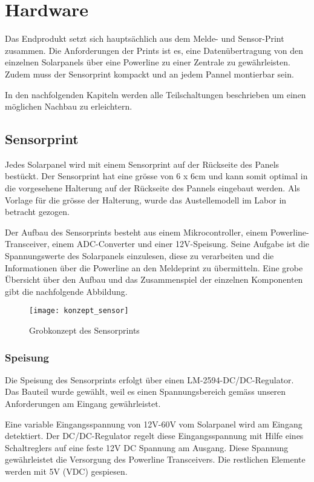 \section{Hardware}
Das Endprodukt setzt sich hauptsächlich aus dem Melde- und Sensor-Print zusammen. Die Anforderungen der Prints ist es, eine Datenübertragung von den einzelnen Solarpanels über eine Powerline zu einer Zentrale zu gewährleisten. Zudem muss der Sensorprint kompackt und an jedem Pannel montierbar sein.

In den nachfolgenden Kapiteln werden alle Teilschaltungen beschrieben um einen möglichen Nachbau zu erleichtern.

\subsection{Sensorprint}


Jedes Solarpanel wird mit einem Sensorprint auf der Rückseite des Panels bestückt. Der Sensorprint hat eine grösse von 6 x 6cm und kann somit optimal in die vorgesehene Halterung auf der Rückseite des Pannels eingebaut werden. Als Vorlage für die grösse der Halterung, wurde das Austellemodell im Labor in betracht gezogen.

Der Aufbau des Sensorprints besteht aus einem Mikrocontroller, einem Powerline-Transceiver, einem ADC-Converter und einer 12V-Speisung. Seine Aufgabe ist die Spannungswerte des Solarpanels einzulesen, diese zu verarbeiten und die Informationen über die Powerline an den Meldeprint zu übermitteln. Eine grobe Übersicht über den Aufbau und das Zusammenspiel der einzelnen Komponenten gibt die nachfolgende Abbildung.

\begin{figure}[h]
\centering
\texttt{[image: konzept\_sensor]}
\caption{Grobkonzept des Sensorprints}
\end{figure}

\subsubsection{Speisung}
Die Speisung des Sensorprints erfolgt über einen LM-2594-DC/DC-Regulator. Das Bauteil wurde gewählt, weil es einen Spannungsbereich gemäss unseren Anforderungen am Eingang gewährleistet.

Eine variable Eingangsspannung von 12V-60V vom Solarpanel wird am Eingang detektiert. Der DC/DC-Regulator regelt diese Eingangsspannung mit Hilfe eines Schaltreglers auf eine feste 12V DC Spannung am Ausgang. Diese Spannung gewährleistet die Versorgung des Powerline Transceivers. Die restlichen Elemente werden mit 5V (VDC) gespiesen.

